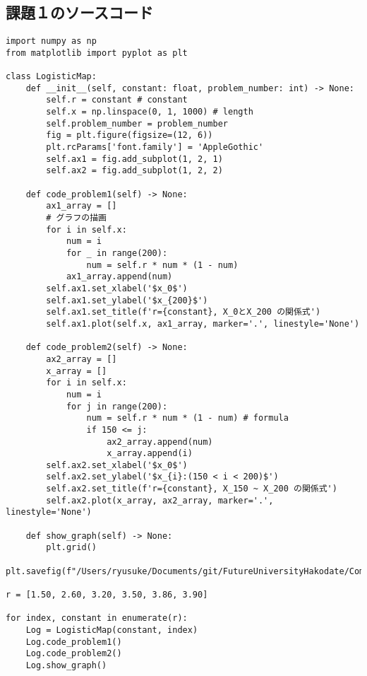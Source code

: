 \documentclass[dvipdfmx,uplatex]{jsarticle}
\begin{document}
\newpage

\subsection{課題１のソースコード}

\begin{lstlisting}[caption=Pythonによるロジスティック写像の描画]
import numpy as np
from matplotlib import pyplot as plt

class LogisticMap:
    def __init__(self, constant: float, problem_number: int) -> None:
        self.r = constant # constant
        self.x = np.linspace(0, 1, 1000) # length
        self.problem_number = problem_number
        fig = plt.figure(figsize=(12, 6))
        plt.rcParams['font.family'] = 'AppleGothic'
        self.ax1 = fig.add_subplot(1, 2, 1)
        self.ax2 = fig.add_subplot(1, 2, 2)

    def code_problem1(self) -> None:
        ax1_array = []
        # グラフの描画
        for i in self.x:
            num = i
            for _ in range(200):
                num = self.r * num * (1 - num)
            ax1_array.append(num)
        self.ax1.set_xlabel('$x_0$')
        self.ax1.set_ylabel('$x_{200}$')
        self.ax1.set_title(f'r={constant}, X_0とX_200 の関係式')
        self.ax1.plot(self.x, ax1_array, marker='.', linestyle='None')

    def code_problem2(self) -> None:
        ax2_array = []
        x_array = []
        for i in self.x:
            num = i
            for j in range(200):
                num = self.r * num * (1 - num) # formula
                if 150 <= j:
                    ax2_array.append(num)
                    x_array.append(i)
        self.ax2.set_xlabel('$x_0$')
        self.ax2.set_ylabel('$x_{i}:(150 < i < 200)$')
        self.ax2.set_title(f'r={constant}, X_150 ~ X_200 の関係式')
        self.ax2.plot(x_array, ax2_array, marker='.', linestyle='None')

    def show_graph(self) -> None:
        plt.grid()
        plt.savefig(f"/Users/ryusuke/Documents/git/FutureUniversityHakodate/ComplexScienceExercise/result/week02_{self.problem_number}.png")

r = [1.50, 2.60, 3.20, 3.50, 3.86, 3.90]

for index, constant in enumerate(r):
    Log = LogisticMap(constant, index)
    Log.code_problem1()
    Log.code_problem2()
    Log.show_graph()
\end{lstlisting}

\newpage
\end{document}
